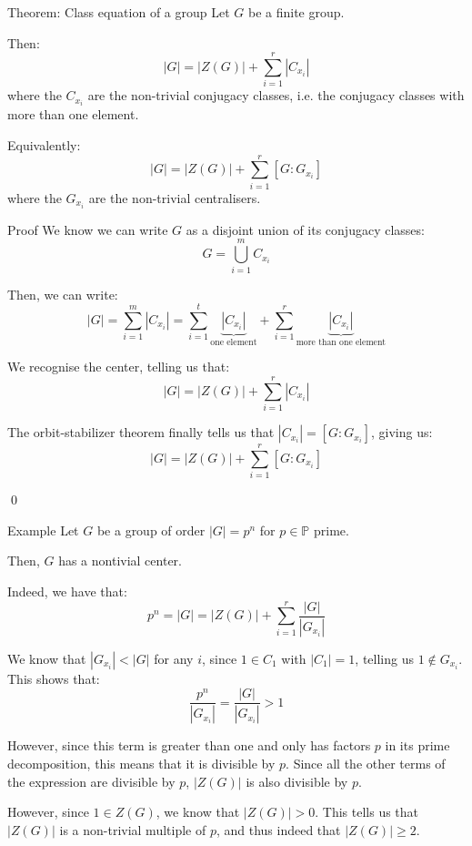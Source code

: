\documentclass[a4paper]{article}
\begin{document}
\begin{parag}{Theorem: Class equation of a group}
    Let $G$ be a finite group.

    Then: 
    \[\left|G\right| = \left|Z\left(G\right)\right| + \sum_{i=1}^{r} \left|C_{x_i}\right|\]
    where the $C_{x_i}$ are the non-trivial conjugacy classes, i.e. the conjugacy classes with more than one element.

    Equivalently:
    \[\left|G\right| = \left|Z\left(G\right)\right| + \sum_{i=1}^{r} \left[G : G_{x_i}\right]\]
    where the $G_{x_i}$ are the non-trivial centralisers.

    \begin{subparag}{Proof}
        We know we can write $G$ as a disjoint union of its conjugacy classes: 
        \[G = \bigcup_{i=1}^{m} C_{x_i}\]
        
        Then, we can write: 
        \[\left|G\right| = \sum_{i=1}^{m}\left|C_{x_i}\right| = \sum_{i=1}^{t} \underbrace{\left|C_{x_i}\right|}_{\text{one element}}  + \sum_{i=1}^{r} \underbrace{\left|C_{x_i}\right|}_{\text{more than one element}}\]

        We recognise the center, telling us that: 
        \[\left|G\right| = \left|Z\left(G\right)\right| + \sum_{i=1}^{r} \left|C_{x_i}\right|\]

        The orbit-stabilizer theorem finally tells us that $\left|C_{x_i}\right| = \left[G : G_{x_i}\right]$, giving us: 
        \[\left|G\right| = \left|Z\left(G\right)\right| + \sum_{i=1}^{r} \left[G : G_{x_i}\right]\]

        \qed
    \end{subparag}
\end{parag}

\begin{parag}{Example}
    Let $G$ be a group of order $\left|G\right| = p^n$ for $p \in \mathbb{P}$ prime.

    Then, $G$ has a nontivial center.

    Indeed, we have that: 
    \[p^n = \left|G\right| = \left|Z\left(G\right)\right| + \sum_{i=1}^{r} \frac{\left|G\right|}{\left|G_{x_i}\right|}\]
    
    We know that $\left|G_{x_i}\right| < \left|G\right|$ for any $i$, since $1 \in C_1$ with $\left|C_1\right| = 1$, telling us $1 \not \in G_{x_i}$. This shows that: 
    \[\frac{p^n}{\left|G_{x_i}\right|} = \frac{\left|G\right|}{\left|G_{x_i}\right|} > 1\]
    
    However, since this term is greater than one and only has factors $p$ in its prime decomposition, this means that it is divisible by $p$. Since all the other terms of the expression are divisible by $p$, $\left|Z\left(G\right)\right|$ is also divisible by $p$.

    However, since $1 \in Z\left(G\right)$, we know that $\left|Z\left(G\right)\right| > 0$. This tells us that $\left|Z\left(G\right)\right|$ is a non-trivial multiple of $p$, and thus indeed that $\left|Z\left(G\right)\right| \geq 2$.
\end{parag}
\end{document}
